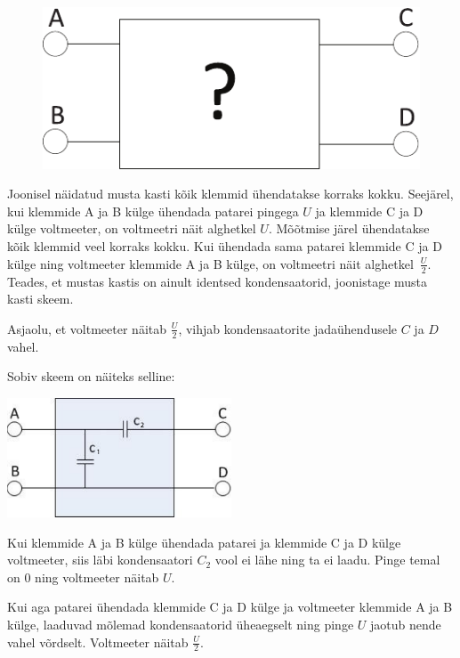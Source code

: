 
\begin{figure}%
\includegraphics[width=\linewidth]{2013-v3g-04-pilt1}%
\end{figure}
Joonisel näidatud musta kasti kõik klemmid ühendatakse korraks kokku.
Seejärel, kui klemmide A ja B külge ühendada patarei
pingega $U$ ja klemmide C ja D külge voltmeeter, on voltmeetri näit alghetkel
$U$. Mõõtmise järel ühendatakse kõik klemmid veel korraks kokku.
Kui ühendada sama patarei klemmide C ja D külge ning voltmeeter
klemmide A ja B külge, on voltmeetri näit alghetkel~$\frac{U}{2}.$
Teades, et mustas kastis on ainult identsed kondensaatorid, joonistage musta kasti skeem.

\hint
Asjaolu, et voltmeeter näitab $\frac{U}{2}$, vihjab kondensaatorite jadaühendusele $C$ ja $D$ vahel.

\solu
Sobiv skeem on näiteks selline:

\begin{center}
\includegraphics[width=0.5\textwidth]{2013-v3g-04-mustkastlah}\\
\end{center}

Kui klemmide A ja B külge ühendada patarei ja klemmide C ja D külge voltmeeter, siis läbi kondensaatori $C_2$ vool ei lähe ning ta ei laadu. Pinge temal on \num{0} ning voltmeeter näitab $U$.

Kui aga patarei ühendada klemmide C ja D külge ja voltmeeter klemmide A ja B külge, laaduvad mõlemad kondensaatorid üheaegselt ning pinge $U$ jaotub nende vahel võrdselt. Voltmeeter näitab $\frac{U}{2}$.

